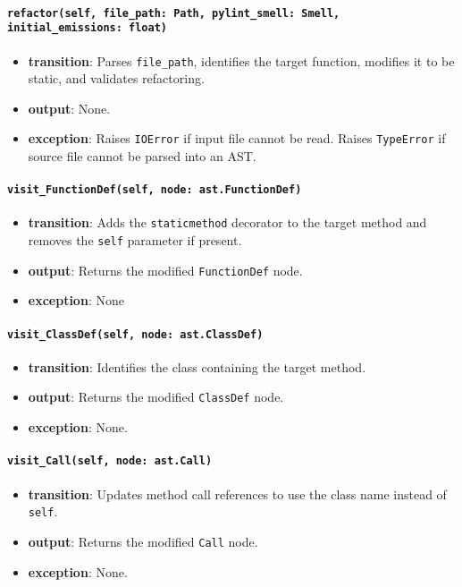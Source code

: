 \documentclass[12pt, titlepage]{article}
\begin{document}
\paragraph{\texttt{refactor(self, file\_path: Path, pylint\_smell: Smell, initial\_emissions: float)}}
\begin{itemize}
  \item \textbf{transition}: Parses \texttt{file\_path}, identifies the target function, modifies it to be static, and validates refactoring.
  \item \textbf{output}: None.
  \item \textbf{exception}: Raises \texttt{IOError} if input file cannot be read. Raises \texttt{TypeError} if source file cannot be parsed into an AST.
\end{itemize}

\paragraph{\texttt{visit\_FunctionDef(self, node: ast.FunctionDef)}}
\begin{itemize}
  \item \textbf{transition}: Adds the \texttt{staticmethod} decorator to the target method and removes the \texttt{self} parameter if present.
  \item \textbf{output}: Returns the modified \texttt{FunctionDef} node.
  \item \textbf{exception}: None
\end{itemize}

\paragraph{\texttt{visit\_ClassDef(self, node: ast.ClassDef)}}
\begin{itemize}
  \item \textbf{transition}: Identifies the class containing the target method.
  \item \textbf{output}: Returns the modified \texttt{ClassDef} node.
  \item \textbf{exception}: None.
\end{itemize}

\paragraph{\texttt{visit\_Call(self, node: ast.Call)}}
\begin{itemize}
  \item \textbf{transition}: Updates method call references to use the class name instead of \texttt{self}.
  \item \textbf{output}: Returns the modified \texttt{Call} node.
  \item \textbf{exception}: None.
\end{itemize}
\end{document}
